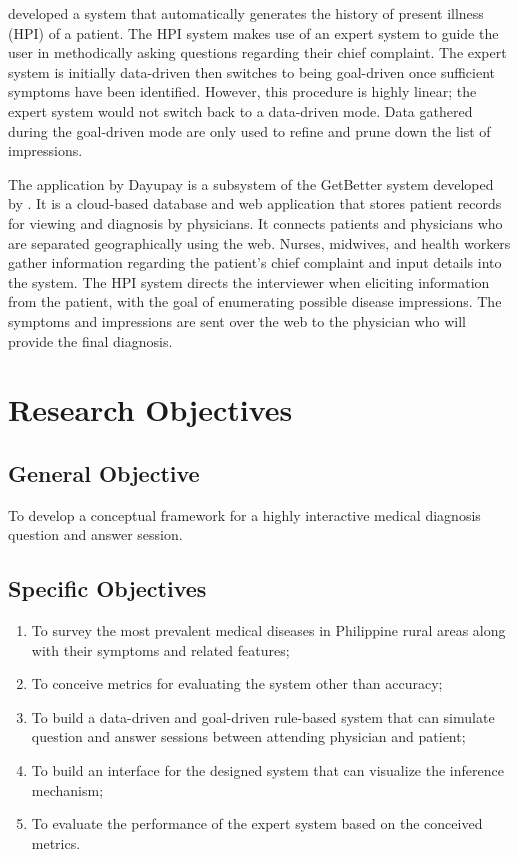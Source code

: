  developed a system that automatically generates the history of present illness (HPI) of a patient.
The HPI system makes use of an expert system to guide the user in methodically asking questions regarding their chief complaint. 
The expert system is initially data-driven then switches to being goal-driven once sufficient symptoms have been identified.
However, this procedure is highly linear; the expert system would not switch back to a data-driven mode.
Data gathered during the goal-driven mode are only used to refine and prune down the list of impressions.

The application by Dayupay is a subsystem of the GetBetter system developed by .
It is a cloud-based database and web application that stores patient records for viewing and diagnosis by physicians.
It connects patients and physicians who are separated geographically using the web.
Nurses, midwives, and health workers gather information regarding the patient's chief complaint and input details into the system.
The HPI system directs the interviewer when eliciting information from the patient, with the goal of enumerating possible disease impressions.
The symptoms and impressions are sent over the web to the physician who will provide the final diagnosis.    

\section{Research Objectives}
\label{sec:researchobjectives}

\subsection{General Objective}
\label{sec:generalobjective}

To develop a conceptual framework for a highly interactive medical diagnosis question and answer session.

\subsection{Specific Objectives}
\label{sec:specificobjectives}

\begin{enumerate}
    \item To survey the most prevalent medical diseases in Philippine rural areas along with their symptoms and related features;
    \item To conceive metrics for evaluating the system other than accuracy;
    \item To build a data-driven and goal-driven rule-based system that can simulate question and answer sessions between attending physician and patient;
    \item To build an interface for the designed system that can visualize the inference mechanism; %
    \item To evaluate the performance of the expert system based on the conceived metrics.
\end{enumerate}


